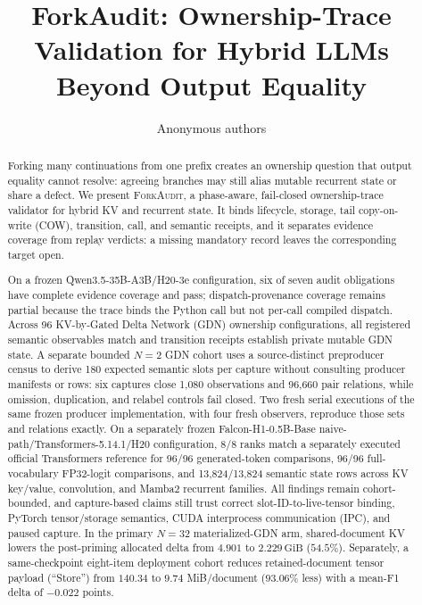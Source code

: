 \documentclass{article}
\title{ForkAudit: Ownership-Trace Validation for Hybrid LLMs Beyond Output Equality}
\author{Anonymous authors}
\newcommand{\method}{\textsc{ForkAudit}}
\newcommand{\gib}{\,\mathrm{GiB}}
\begin{document}
\raggedbottom
\maketitle

\begin{abstract}
Forking many continuations from one prefix creates an ownership question that
output equality cannot resolve: agreeing branches may still alias mutable
recurrent state or share a defect.  We present \method{}, a phase-aware,
fail-closed ownership-trace validator for hybrid KV and recurrent state.  It
binds lifecycle, storage, tail copy-on-write (COW), transition, call, and
semantic receipts,
and it separates evidence coverage from replay verdicts: a missing mandatory
record leaves the corresponding target open.

On a frozen Qwen3.5-35B-A3B/H20-3e configuration, six of seven audit obligations
have complete evidence coverage and pass; dispatch-provenance coverage remains
partial because the trace binds the Python call but not per-call compiled
dispatch.  Across 96
KV-by-Gated Delta Network (GDN) ownership configurations, all registered
semantic observables match
and transition receipts establish private mutable GDN state.  A separate bounded
$N=2$ GDN cohort uses a source-distinct preproducer census to derive 180 expected
semantic slots per capture without consulting producer manifests or rows: six
captures close 1,080 observations and 96,660 pair relations, while omission,
duplication, and relabel controls fail closed.  Two fresh serial executions of
the same frozen producer implementation, with four fresh observers, reproduce
those sets and relations exactly.  On a separately frozen Falcon-H1-0.5B-Base
naive-path/Transformers-5.14.1/H20 configuration, 8/8 ranks match a separately
executed official Transformers reference for 96/96 generated-token comparisons,
96/96 full-vocabulary FP32-logit comparisons, and 13,824/13,824 semantic state
rows across KV key/value, convolution, and Mamba2 recurrent families.  All
findings remain cohort-bounded, and capture-based claims still trust correct
slot-ID-to-live-tensor binding, PyTorch tensor/storage semantics, CUDA interprocess
communication (IPC), and paused capture.  In the primary $N=32$
materialized-GDN arm, shared-document KV lowers the post-priming allocated delta
from $4.901$ to $2.229\gib$ ($54.5\%$).  Separately, a same-checkpoint eight-item
deployment cohort reduces retained-document tensor payload (``Store'') from
$140.34$ to $9.74$ MiB/document ($93.06\%$ less) with a mean-F1 delta of
$-0.022$ points.
\end{abstract}
\end{document}
